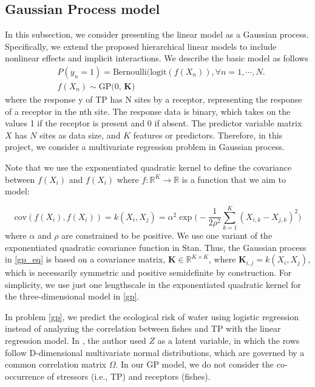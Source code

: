 \documentclass[a4paper]{artikel3}
\begin{document}
\subsection{Gaussian Process model}

In this subsection, we consider presenting the linear model as a Gaussian process. Specifically, we extend the proposed hierarchical linear models to include nonlinear eﬀects and implicit interactions. We describe the basic model as follows
\begin{align}
    &P(y_n=1) = \text{Bernoulli(logit} (f(X_n)), \forall n=1,\cdots,N. \label{gp}\\
    &f(X_n) \sim \text{GP(0, $\boldsymbol{K}$)} \label{gp_eq}
\end{align}
where the response y of TP has N sites by a receptor, representing the response of a receptor in the nth site. The response data is binary, which takes on the values 1 if the receptor is present and 0 if absent. The predictor variable matrix $X$ has $N$ sites as data size, and $K$ features or predictors. Therefore, in this project, we consider a multivariate regression problem in Gaussian process. 

Note that we use the exponentiated quadratic kernel to define the covariance between $f(X_i)$ and $f(X_i)$ where $f:\mathbb{R}^K\rightarrow \mathbb{R}$ is a function that we aim to model:

\begin{equation}\label{kernel}
    \text{cov}(f(X_i),f(X_i)) = k(X_i,X_j) = \alpha^2 \exp{\bigg(-\frac{1}{2\rho^2}\sum_{k=1}^{K}(X_{i,k}-X_{j,k})^2\bigg)}
\end{equation}
where $\alpha$ and $\rho$ are constrained to be positive. We use one variant of the exponentiated quadratic covariance function in Stan. Thus, the Gaussian process in \eqref{gp_eq} is based on a covariance matrix, $\boldsymbol{K} \in \mathbb{R}^{K\times K}$, where $\boldsymbol{K}_{i,j}=k(X_i,X_j)$, which is necessarily symmetric and positive semidefinite by construction. For simplicity, we use just one lengthscale in the exponentiated quadratic kernel for the three-dimensional model in \eqref{gp}.

In problem \eqref{gp}, we predict the ecological risk of water using logistic regression instead of analyzing the correlation between fishes and TP with the linear regression model. In \cite{martin2018empirically}, the author used $Z$ as a latent variable, in which the rows follow D-dimensional multivariate normal distributions, which are governed by a common correlation matrix $\Omega$. In our GP model, we do not consider the co-occurrence of stressors (i.e., TP) and receptors (fishes). 
\end{document}
